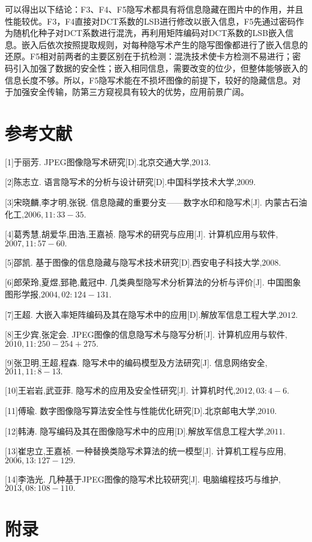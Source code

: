 \documentclass[onecolumn,a4paper,12pt]{article}
\begin{document}
可以得出以下结论：F3、F4、F5隐写术都具有将信息隐藏在图片中的作用，并且性能较优。F3，F4直接对DCT系数的LSB进行修改以嵌入信息，F5先通过密码作为随机化种子对DCT系数进行混洗，再利用矩阵编码对DCT系数的LSB嵌入信息。嵌入后依次按照提取规则，对每种隐写术产生的隐写图像都进行了嵌入信息的还原。F5相对前两者的主要区别在于抗检测：混洗技术使卡方检测不易进行；密码引入加强了数据的安全性；嵌入相同信息，需要改变的位少，但整体能够嵌入的信息长度不够。所以，F5隐写术能在不损坏图像的前提下，较好的隐藏信息。对于加强安全传输，防第三方窥视具有较大的优势，应用前景广阔。

\section{参考文献}

[1]于丽芳. JPEG图像隐写术研究[D].北京交通大学,$2013.$

[2]陈志立. 语言隐写术的分析与设计研究[D].中国科学技术大学,$2009.$

[3]宋晓麟,李才明,张锐. 信息隐藏的重要分支——数字水印和隐写术[J]. 内蒙古石油化工,$2006,11:33-35.$

[4]葛秀慧,胡爱华,田浩,王嘉祯. 隐写术的研究与应用[J]. 计算机应用与软件,$2007,11:57-60.$

[5]邵凯. 基于图像的信息隐藏与隐写术技术研究[D].西安电子科技大学,$2008.$

[6]郎荣玲,夏煜,郅艳,戴冠中. 几类典型隐写术分析算法的分析与评价[J]. 中国图象图形学报,$2004,02:124-131.$

[7]王超. 大嵌入率矩阵编码及其在隐写术中的应用[D].解放军信息工程大学,$2012.$

[8]王少宾,张定会. JPEG图像的信息隐写术与隐写分析[J]. 计算机应用与软件,$2010,11:250-254+275.$

[9]张卫明,王超,程森. 隐写术中的编码模型及方法研究[J]. 信息网络安全,$2011,11:8-13.$

[10]王岩岩,武亚菲. 隐写术的应用及安全性研究[J]. 计算机时代,$2012,03:4-6.$

[11]傅瑜. 数字图像隐写算法安全性与性能优化研究[D].北京邮电大学,$2010.$

[12]韩涛. 隐写编码及其在图像隐写术中的应用[D].解放军信息工程大学,$2011.$

[13]崔忠立,王嘉祯. 一种替换类隐写术算法的统一模型[J]. 计算机工程与应用,$2006,13:127-129.$

[14]李浩光. 几种基于JPEG图像的隐写术比较研究[J]. 电脑编程技巧与维护,$2013,08:108-110.$

\clearpage
\section*{附录}
\end{document}
